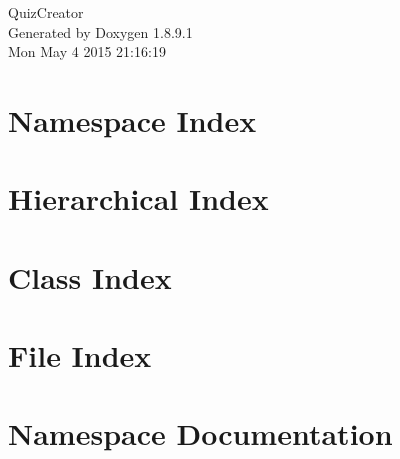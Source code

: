 \documentclass[twoside]{book}
\newcommand{\+}{\discretionary{\mbox{\scriptsize$\hookleftarrow$}}{}{}}
\newcommand{\clearemptydoublepage}{%
  \newpage{\pagestyle{empty}\cleardoublepage}%
}
\begin{document}
\hypersetup{pageanchor=false,
             bookmarks=true,
             bookmarksnumbered=true,
             pdfencoding=unicode
            }
\begin{titlepage}
\vspace*{7cm}
\begin{center}%
{\Large Quiz\+Creator }\\
\vspace*{1cm}
{\large Generated by Doxygen 1.8.9.1}\\
\vspace*{0.5cm}
{\small Mon May 4 2015 21:16:19}\\
\end{center}
\end{titlepage}
\clearemptydoublepage
\tableofcontents
\clearemptydoublepage
{}
\hypersetup{pageanchor=true}

\chapter{Namespace Index}

\chapter{Hierarchical Index}

\chapter{Class Index}

\chapter{File Index}

\chapter{Namespace Documentation}




\end{document}

